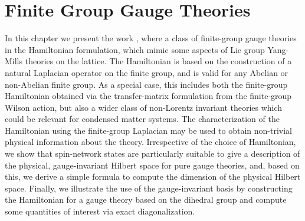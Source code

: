\chapter{Finite Group Gauge Theories}
\label{chap:finite_group_gauge_theories}


In this chapter we present the work \cite{pradhan_unpublished}, where a class of finite-group gauge theories in the Hamiltonian formulation, which mimic some aspects of Lie group Yang-Mills theories on the lattice.
The Hamiltonian is based on the construction of a natural Laplacian operator on the finite group, and is valid for any Abelian or non-Abelian finite group.
As a special case, this includes both the finite-group Hamiltonian obtained via the transfer-matrix formulation from the finite-group Wilson action, but also a wider class of non-Lorentz invariant theories which could be relevant for condensed matter systems.
The characterization of the Hamiltonian using the finite-group Laplacian may be used to obtain non-trivial physical information about the theory.
Irrespective of the choice of Hamiltonian, we show that spin-network states are particularly suitable to give a description of the physical, gauge-invariant Hilbert space for pure gauge theories, and, based on this, we derive a simple formula to compute the dimension of the physical Hilbert space.
Finally, we illustrate the use of the gauge-invariant basis by constructing the Hamiltonian for a gauge theory based on the dihedral group and compute some quantities of interest via exact diagonalization.


% 



% 














